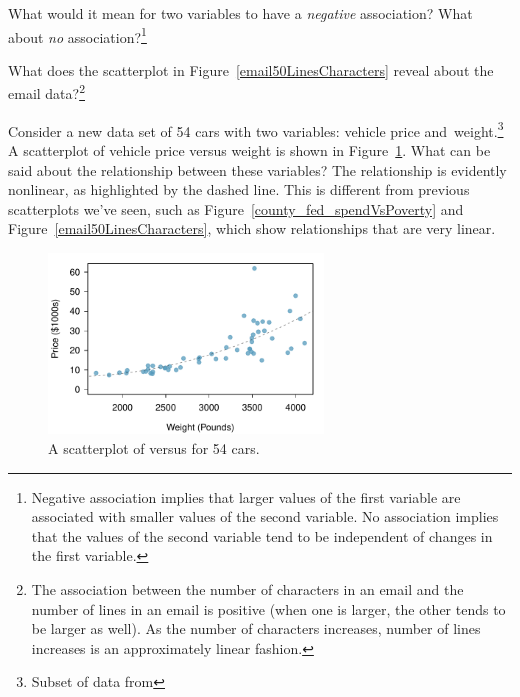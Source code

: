 \begin{exercise}What would it mean for two variables to have a \emph{negative} association? What about \emph{no} association?\footnote{Negative association implies that larger values of the first variable are associated with smaller values of the second variable. No association implies that the values of the second variable tend to be independent of changes in the first variable.}
\end{exercise}

\begin{exercise}
What does the scatterplot in Figure~\ref{email50LinesCharacters} reveal about the email data?\footnote{The association between the number of characters in an email and the number of lines in an email is positive (when one is larger, the other tends to be larger as well). As the number of characters increases, number of lines increases is an approximately linear fashion.}
\end{exercise}

\begin{example}{Consider a new data set of 54 cars with two variables: vehicle price and~weight.\footnote{Subset of data from } A scatterplot of vehicle price versus weight is shown in Figure~\ref{carsPriceVsWeight}. What can be said about the relationship between these variables?}
The relationship is evidently nonlinear, as highlighted by the dashed line. This is different from previous scatterplots we've seen, such as Figure~\vref{county_fed_spendVsPoverty} and Figure~\ref{email50LinesCharacters}, which show relationships that are very linear.

\begin{figure}[h]
   \centering
   \includegraphics[width=0.65\textwidth]{ch_summarizing_data/figures/carsPriceVsWeight/carsPriceVsWeight}
   \caption{A scatterplot of  versus  for 54 cars.}
   \label{carsPriceVsWeight}
\end{figure}
\end{example}

